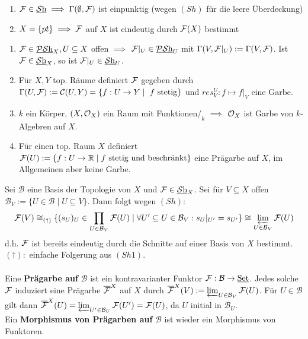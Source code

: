 \begin{rem}
\label{rem:pathologien-garben}
\begin{enumerate}
	\item $\mathcal{F} \in \operatorname{\underline{\mathcal{S}h}} \implies \Gamma(\emptyset, \mathcal{F})$ ist einpunktig (wegen $(Sh)$ für die leere Überdeckung)
	\item $X = \{ pt \} \implies \mathcal{F}$ auf $X$ ist eindeutig durch $\mathcal{F}(X)$ bestimmt
\end{enumerate}
\end{rem}


\begin{example}
\label{bsp:beispiele-von-garben}	
\begin{enumerate}
	\item $\mathcal{F} \in \operatorname{\underline{\mathcal{PS}h}}_{X}, U \subseteq X$ offen $\implies$ $\mathcal{F}|_{U} \in \operatorname{\underline{\mathcal{PS}h}}_{U}$ mit $\Gamma(V, \mathcal{F}|_{U}) := \Gamma(V, \mathcal{F})$. Ist $\mathcal{F} \in \operatorname{\underline{\mathcal{S}h}}_{X}$, so ist $\mathcal{F}|_{U} \in \operatorname{\underline{\mathcal{S}h}}_{U}$. 
	\item Für $X,Y$ top. Räume definiert $\mathcal{F}$ gegeben durch $\Gamma(U, \mathcal{F}) := \mathcal{C}(U, Y) = \{ f : U \to Y \mid \ f \text{ stetig}\}$ und $res^{U}_{V} : f \mapsto f|_{V}$ eine Garbe.
	\item $k$ ein Körper, $(X,\mathcal{O}_X)$ ein Raum mit Funktionen$/_k$ $\implies$ $\mathcal{O}_{X}$ ist Garbe von $k$-Algebren auf $X$.
	\item Für einen top. Raum $X$ definiert $\mathcal{F}(U) := \{ f: U \to \mathbb R \mid f \text{ stetig und beschränkt}\}$ eine Prägarbe auf $X$, im Allgemeinen aber keine Garbe.
\end{enumerate}
\end{example}

Sei $\mathcal{B}$ eine Basis der Topologie von $X$ und $\mathcal{F} \in \operatorname{\underline{\mathcal{S}h}}_{X}$. Sei für $V \subseteq X$ offen $\mathcal{B}_{V} := \{ U \in \mathcal{B} \mid U \subseteq V\}$. Dann folgt wegen $(Sh)$:\\
\[
\mathcal{F}(V) \cong_{(\dagger)} \{ (s_{U})_{U} \in \prod_{U \in \mathcal{B}_{V}} \mathcal{F}(U) \mid \forall U' \subseteq U \in \mathcal{B}_{V}: s_{U}|_{U'} = s_{U'}\} \cong \varprojlim_{U \in \mathcal{B}_{V}} \mathcal{F}(U)
\]d.h. $\mathcal{F}$ ist bereits eindeutig durch die Schnitte auf einer Basis von $X$ bestimmt.\\
$(\dagger):$ einfache Folgerung aus $(Sh1)$.\\
\\
Eine \textbf{Prägarbe auf } $\mathcal{B}$ ist ein kontravarianter Funktor $\mathcal{F} : \mathcal{B} \to \operatorname{\underline{Set}}$. Jedes solche $\mathcal{F}$ induziert eine Prägarbe $\overline{\mathcal{F}}^{X}$ auf $X$ durch $\overline{\mathcal{F}}^{X}(V) := \varprojlim_{U \in \mathcal{B}_{V}} \mathcal{F}(U)$.
Für $U \in \mathcal{B}$ gilt dann $\overline{\mathcal{F}}^{X}(U) = \varprojlim_{U' \in \mathcal{B}_{U}}\mathcal{F}(U') = \mathcal{F}(U)$, da $U$ initial in $\mathcal{B}_{U}$.\\ Ein \textbf{Morphismus von Prägarben auf } $\mathcal{B}$ ist wieder ein Morphismus von Funktoren.

